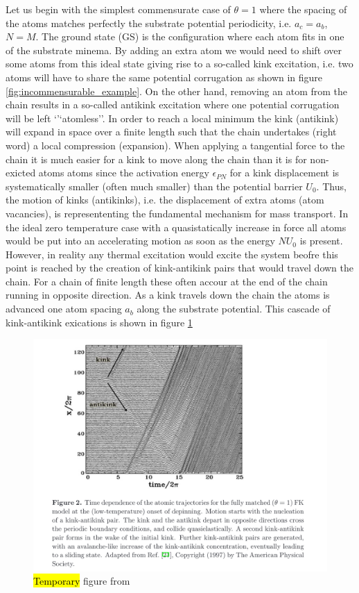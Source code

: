 Let us begin with the simplest commensurate case of $\theta = 1$ where the
spacing of the atoms matches perfectly the substrate potential periodicity, i.e.
$a_c = a_b$, $N = M$. The ground state (GS) is the configuration where each atom
fits in one of the substrate minema. By adding an extra atom we would need to
shift over some atoms from this ideal state giving rise to a so-called kink
excitation, i.e. two atoms will have to share the same potential corrugation as
shown in figure \ref{fig:incommensurable_example}.  On the other hand, removing an atom from the chain results in a so-called antikink excitation where one potential corrugation will be left `'`atomless''. In order to reach a local minimum the kink
(antikink) will expand in space over a finite length such that the chain undertakes (right word) a local compression (expansion). When applying a tangential force to the
chain it is much easier for a kink to move along the chain than it is for non-exicted atoms atoms since the activation energy $\epsilon_{PN}$ for a kink displacement is
systematically smaller (often much smaller) than the potential barrier $U_0$.
Thus, the motion of kinks (antikinks), i.e. the displacement of extra atoms
(atom vacancies), is represententing the fundamental mechanism for mass transport. In
the ideal zero temperature case with a quasistatically increase in
force all atoms would be put into an accelerating motion as soon as the energy
$NU_0$ is present. However, in reality any thermal excitation would excite the
system beofre this point is reached by the creation of kink-antikink pairs that would travel down the chain. For a chain of finite length these often accour at the end of the chain running in opposite direction. As a kink travels down the chain the atoms is advanced one atom spacing $a_b$ along the substrate potential.  This cascade of kink-antikink exications is shown in figure \ref{fig:kink_antikink}


\begin{figure}[H]
  \centering
  \includegraphics[width=0.8\linewidth]{figures/theory/kink_antikink.png}
  \caption{\hl{Temporary} figure from \cite{Manini_2016}}
  \label{fig:kink_antikink}
\end{figure}


